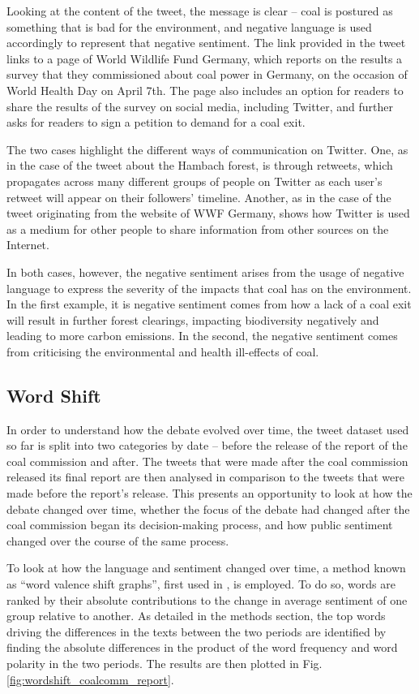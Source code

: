\documentclass[12pt,onecolumn,twoside]{layout}
\begin{document}
Looking at the content of the tweet, the message is clear -- coal is postured as something that is bad for the environment, and negative language is used accordingly to represent that negative sentiment. The link provided in the tweet links to a page of World Wildlife Fund Germany, which reports on the results a survey that they commissioned about coal power in Germany, on the occasion of World Health Day on April 7th. The page also includes an option for readers to share the results of the survey on social media, including Twitter, and further asks for readers to sign a petition to demand for a coal exit.

The two cases highlight the different ways of communication on Twitter. One, as in the case of the tweet about the Hambach forest, is through retweets, which propagates across many different groups of people on Twitter as each user's retweet will appear on their followers' timeline. Another, as in the case of the tweet originating from the website of WWF Germany, shows how Twitter is used as a medium for other people to share information from other sources on the Internet.

In both cases, however, the negative sentiment arises from the usage of negative language to express the severity of the impacts that coal has on the environment. In the first example, it is negative sentiment comes from how a lack of a coal exit will result in further forest clearings, impacting biodiversity negatively and leading to more carbon emissions. In the second, the negative sentiment comes from criticising the environmental and health ill-effects of coal.

\subsection*{Word Shift}
In order to understand how the debate evolved over time, the tweet dataset used so far is split into two categories by date -- before the release of the report of the coal commission and after. The tweets that were made after the coal commission released its final report are then analysed in comparison to the tweets that were made before the report's release. This presents an opportunity to look at how the debate changed over time, whether the focus of the debate had changed after the coal commission began its decision-making process, and how public sentiment changed over the course of the same process.

To look at how the language and sentiment changed over time, a method known as ``word valence shift graphs'', first used in \citep{Dodds2011}, is employed. To do so, words are ranked by their absolute contributions to the change in average sentiment of one group relative to another. As detailed in the methods section, the top words driving the differences in the texts between the two periods are identified by finding the absolute differences in the product of the word frequency and word polarity in the two periods. The results are then plotted in Fig. \ref{fig:wordshift_coalcomm_report}.
\end{document}
